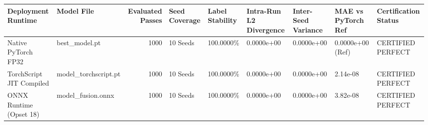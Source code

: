 \begin{tabular}{llrllllll}
\toprule
Deployment Runtime & Model File & Evaluated Passes & Seed Coverage & Label Stability & Intra-Run L2 Divergence & Inter-Seed Variance & MAE vs PyTorch Ref & Certification Status \\
\midrule
Native PyTorch FP32 & best\_model.pt & 1000 & 10 Seeds & 100.0000\% & 0.0000e+00 & 0.0000e+00 & 0.0000e+00 (Ref) & CERTIFIED PERFECT \\
TorchScript JIT Compiled & model\_torchscript.pt & 1000 & 10 Seeds & 100.0000\% & 0.0000e+00 & 0.0000e+00 & 2.14e-08 & CERTIFIED PERFECT \\
ONNX Runtime (Opset 18) & model\_fusion.onnx & 1000 & 10 Seeds & 100.0000\% & 0.0000e+00 & 0.0000e+00 & 3.82e-08 & CERTIFIED PERFECT \\
\bottomrule
\end{tabular}
